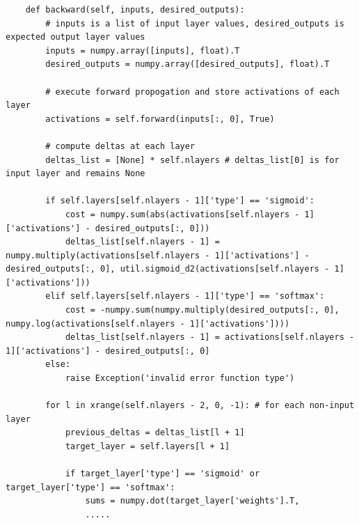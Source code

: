 \documentclass[10pt,twocolumn]{article}
\begin{document}
\begin{lstlisting}
	def backward(self, inputs, desired_outputs):
		# inputs is a list of input layer values, desired_outputs is expected output layer values
		inputs = numpy.array([inputs], float).T
		desired_outputs = numpy.array([desired_outputs], float).T

		# execute forward propogation and store activations of each layer
		activations = self.forward(inputs[:, 0], True)

		# compute deltas at each layer
		deltas_list = [None] * self.nlayers # deltas_list[0] is for input layer and remains None

		if self.layers[self.nlayers - 1]['type'] == 'sigmoid':
			cost = numpy.sum(abs(activations[self.nlayers - 1]['activations'] - desired_outputs[:, 0]))
			deltas_list[self.nlayers - 1] = numpy.multiply(activations[self.nlayers - 1]['activations'] - desired_outputs[:, 0], util.sigmoid_d2(activations[self.nlayers - 1]['activations']))
		elif self.layers[self.nlayers - 1]['type'] == 'softmax':
			cost = -numpy.sum(numpy.multiply(desired_outputs[:, 0], numpy.log(activations[self.nlayers - 1]['activations'])))
			deltas_list[self.nlayers - 1] = activations[self.nlayers - 1]['activations'] - desired_outputs[:, 0]
		else:
			raise Exception('invalid error function type')

		for l in xrange(self.nlayers - 2, 0, -1): # for each non-input layer
			previous_deltas = deltas_list[l + 1]
			target_layer = self.layers[l + 1]

			if target_layer['type'] == 'sigmoid' or target_layer['type'] == 'softmax':
				sums = numpy.dot(target_layer['weights'].T,
				.....

\end{lstlisting}
\end{document}
